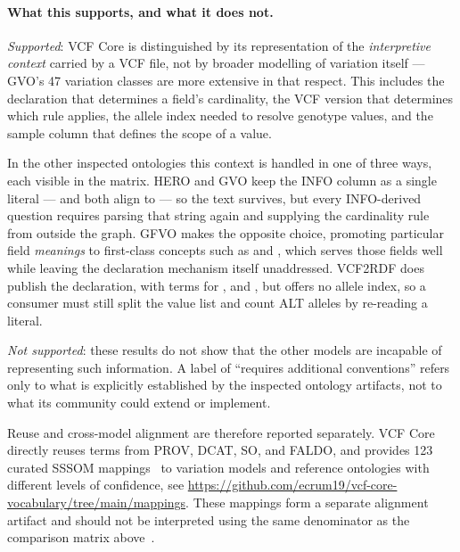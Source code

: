 \paragraph{What this supports, and what it does not.}
\emph{Supported}: VCF Core is distinguished by its representation of the \emph{interpretive context} carried by a VCF file, not by broader modelling of variation itself --- GVO's 47 variation classes are more extensive in that respect. 
This includes the declaration that determines a field's cardinality, the VCF version that determines which rule applies, the allele index needed to resolve genotype values, and the sample column that defines the scope of a value.

In the other inspected ontologies this context is handled in one of three ways, each visible in the matrix.
HERO and GVO keep the INFO column as a single literal ---  and  both align to  --- so the text survives, but every INFO-derived question requires parsing that string again and supplying the cardinality rule from outside the graph.
GFVO makes the opposite choice, promoting particular field \emph{meanings} to first-class concepts such as  and , which serves those fields well while leaving the declaration mechanism itself unaddressed.
VCF2RDF does publish the declaration, with terms for ,  and , but offers no allele index, so a consumer must still split the value list and count ALT alleles by re-reading a literal.

\emph{Not supported}: these results do not show that the other models are incapable of representing such information. 
A label of ``requires additional conventions'' refers only to what is explicitly established by the inspected ontology artifacts, not to what its community could extend or implement.

Reuse and cross-model alignment are therefore reported separately. 
VCF Core directly reuses terms from PROV, DCAT, SO, and FALDO, and provides 123 curated SSSOM mappings~\cite{matentzoglu2022sssom} to variation models and reference ontologies with different levels of confidence, see \href{vcf-core-vocabulary/mappings}{https://github.com/ecrum19/vcf-core-vocabulary/tree/main/mappings}. 
These mappings form a separate alignment artifact and should not be interpreted using the same denominator as the comparison matrix above~\cite{vcfc210}.

